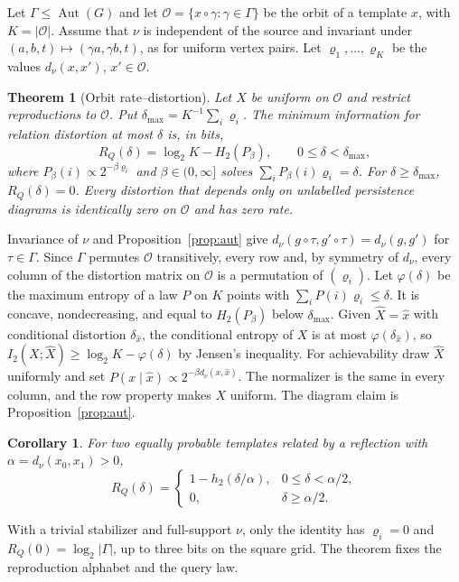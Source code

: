\documentclass[10pt,conference]{IEEEtran}
\newtheorem{theorem}{Theorem}
\newtheorem{corollary}{Corollary}
\newcommand{\Aut}{\operatorname{Aut}}
\begin{document}
Let $\Gamma\le\Aut(G)$ and let $\mathcal O=\{x\circ\gamma:\gamma\in\Gamma\}$ be the orbit of a template $x$, with $K=|\mathcal O|$. Assume that $\nu$ is independent of the source and invariant under $(a,b,t)\mapsto(\gamma a,\gamma b,t)$, as for uniform vertex pairs. Let $\varrho_1,\ldots,\varrho_K$ be the values $d_\nu(x,x')$, $x'\in\mathcal O$.
\begin{theorem}[Orbit rate--distortion]\label{thm:orbit}
Let $X$ be uniform on $\mathcal O$ and restrict reproductions to $\mathcal O$. Put $\delta_{\max}=K^{-1}\sum_i\varrho_i$. The minimum information for relation distortion at most $\delta$ is, in bits,
\begin{equation}
 R_Q(\delta)=\log_2K-H_2(P_\beta),\qquad 0\le\delta<\delta_{\max}, \label{eq:orbit}
\end{equation}
where $P_\beta(i)\propto2^{-\beta\varrho_i}$ and $\beta\in(0,\infty]$ solves $\sum_iP_\beta(i)\varrho_i=\delta$. For $\delta\ge\delta_{\max}$, $R_Q(\delta)=0$. Every distortion that depends only on unlabelled persistence diagrams is identically zero on $\mathcal O$ and has zero rate.
\end{theorem}
\begin{IEEEproof}
Invariance of $\nu$ and Proposition~\ref{prop:aut} give $d_\nu(g\circ\tau,g'\circ\tau)=d_\nu(g,g')$ for $\tau\in\Gamma$. Since $\Gamma$ permutes $\mathcal O$ transitively, every row and, by symmetry of $d_\nu$, every column of the distortion matrix on $\mathcal O$ is a permutation of $(\varrho_i)$. Let $\varphi(\delta)$ be the maximum entropy of a law $P$ on $K$ points with $\sum_iP(i)\varrho_i\le\delta$. It is concave, nondecreasing, and equal to $H_2(P_\beta)$ below $\delta_{\max}$. Given $\hat X=\hat x$ with conditional distortion $\delta_{\hat x}$, the conditional entropy of $X$ is at most $\varphi(\delta_{\hat x})$, so $I_2(X;\hat X)\ge\log_2K-\varphi(\delta)$ by Jensen's inequality. For achievability draw $\hat X$ uniformly and set $P(x\mid\hat x)\propto2^{-\beta d_\nu(x,\hat x)}$. The normalizer is the same in every column, and the row property makes $X$ uniform. The diagram claim is Proposition~\ref{prop:aut}.
\end{IEEEproof}
\begin{corollary}\label{cor:binary}
For two equally probable templates related by a reflection with $\alpha=d_\nu(x_0,x_1)>0$,
\begin{equation}
 R_Q(\delta)=
 \begin{cases}
 1-h_2(\delta/\alpha),&0\le\delta<\alpha/2,\\
 0,&\delta\ge\alpha/2 .
 \end{cases} \label{eq:binary}
\end{equation}
\end{corollary}
With a trivial stabilizer and full-support $\nu$, only the identity has $\varrho_i=0$ and $R_Q(0)=\log_2|\Gamma|$, up to three bits on the square grid. The theorem fixes the reproduction alphabet and the query law.
\end{document}
